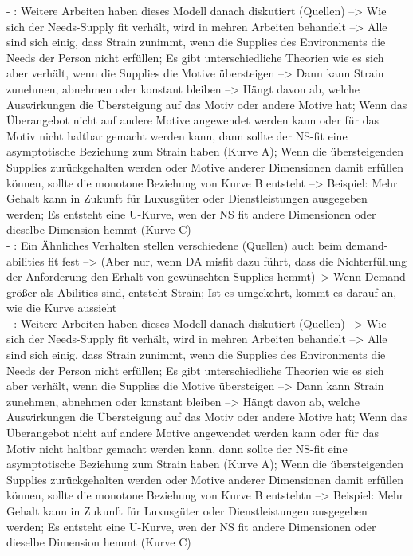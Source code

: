 \newpage
- \cite[S. 21]{edwards:2008}: Weitere Arbeiten haben dieses Modell danach diskutiert (Quellen) --> Wie sich der Needs-Supply fit verhält, wird in mehren Arbeiten behandelt --> Alle sind sich einig, dass Strain zunimmt, wenn die Supplies des Environments die Needs der Person nicht erfüllen; Es gibt unterschiedliche Theorien wie es sich aber verhält, wenn die Supplies die Motive übersteigen --> Dann kann Strain zunehmen, abnehmen oder konstant bleiben --> Hängt davon ab, welche Auswirkungen die Übersteigung auf das Motiv oder andere Motive hat; Wenn das Überangebot nicht auf andere Motive angewendet werden kann oder für das Motiv nicht haltbar gemacht werden kann, dann sollte der NS-fit eine asymptotische Beziehung zum Strain haben (Kurve A); Wenn die übersteigenden Supplies zurückgehalten werden oder Motive anderer Dimensionen damit erfüllen können, sollte die monotone Beziehung von Kurve B entsteht --> Beispiel: Mehr Gehalt kann in Zukunft für Luxusgüter oder Dienstleistungen ausgegeben werden; Es entsteht eine U-Kurve, wen der NS fit andere Dimensionen oder dieselbe Dimension hemmt (Kurve C) \\
- \cite[S. 22f.]{edwards:2008}: Ein Ähnliches Verhalten stellen verschiedene (Quellen) auch beim demand-abilities fit fest --> (Aber nur, wenn DA misfit dazu führt, dass die Nichterfüllung der Anforderung den Erhalt von gewünschten Supplies hemmt)--> Wenn Demand größer als Abilities sind, entsteht Strain; Ist es umgekehrt, kommt es darauf an, wie die Kurve aussieht \\
- \cite[S. 21]{edwards:2008}: Weitere Arbeiten haben dieses Modell danach diskutiert (Quellen) --> Wie sich der Needs-Supply fit verhält, wird in mehren Arbeiten behandelt --> Alle sind sich einig, dass Strain zunimmt, wenn die Supplies des Environments die Needs der Person nicht erfüllen; Es gibt unterschiedliche Theorien wie es sich aber verhält, wenn die Supplies die Motive übersteigen --> Dann kann Strain zunehmen, abnehmen oder konstant bleiben --> Hängt davon ab, welche Auswirkungen die Übersteigung auf das Motiv oder andere Motive hat; Wenn das Überangebot nicht auf andere Motive angewendet werden kann oder für das Motiv nicht haltbar gemacht werden kann, dann sollte der NS-fit eine asymptotische Beziehung zum Strain haben (Kurve A); Wenn die übersteigenden Supplies zurückgehalten werden oder Motive anderer Dimensionen damit erfüllen können, sollte die monotone Beziehung von Kurve B entstehtn --> Beispiel: Mehr Gehalt kann in Zukunft für Luxusgüter oder Dienstleistungen ausgegeben werden; Es entsteht eine U-Kurve, wen der NS fit andere Dimensionen oder dieselbe Dimension hemmt (Kurve C) \\
